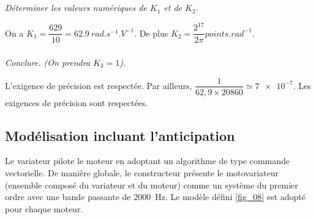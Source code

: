\documentclass[10pt,fleqn]{article} %
\begin{document}
\subparagraph{\label{q}}\textit{Déterminer les valeurs numériques de $K_1$ et de $K_2$.}
\ifprof
\begin{corrige}

On a $K_1 = \dfrac{629}{10} = \SI{62,9}{rad.s^{-1}.V^{-1}}$.
De plus $K_2 = \dfrac{2^{17}}{2\pi } \si{points.rad^{-1}}$.


\end{corrige}
\else
\fi

\subparagraph{\label{q}}\textit{Conclure. (On prendra $K_3 = 1$).}
\ifprof
\begin{corrige}
L'exigence de précision est respectée. 
Par ailleurs, $\dfrac{1}{62,9\times 20860} \simeq \num{7e-7}$. Les exigences de précision sont respectées.
\end{corrige}
\else
\fi



\subsection{Modélisation incluant l'anticipation}

\ifprof
\else

Le variateur pilote le moteur en adoptant un algorithme de type commande vectorielle. De manière globale, le
constructeur présente le motovariateur (ensemble composé du variateur et du moteur) comme un système du
premier ordre avec une bande passante de \SI{2000}{Hz}. Le modèle défini \autoref{fig_08} est adopté pour chaque moteur.
\end{document}
